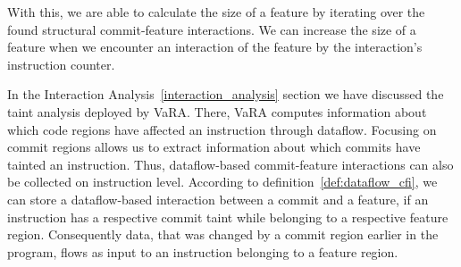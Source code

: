 With this, we are able to calculate the size of a feature by iterating over the found structural commit-feature interactions.
We can increase the size of a feature when we encounter an interaction of the feature by the interaction's instruction counter. 

In the Interaction Analysis~\ref{interaction_analysis} section we have discussed the taint analysis deployed by VaRA.
There, VaRA computes information about which code regions have affected an instruction through dataflow.
Focusing on commit regions allows us to extract information about which commits have tainted an instruction.
Thus, dataflow-based commit-feature interactions can also be collected on instruction level.
According to definition~\ref{def:dataflow_cfi}, we can store a dataflow-based interaction between a commit and a feature, if an instruction has a respective commit taint while belonging to a respective feature region.
Consequently data, that was changed by a commit region earlier in the program, flows as input to an instruction belonging to a feature region. 
\iffalse
For our research we examine numerous software projects to get a wide range of reference data, as commit-feature interactions could potentially vary greatly between different code spaces.
Accordingly, the VaRA-Tool-Suite was extended making it possible to generate a report comprising all found CFIs of an according type in a software project.
This aids us in examining several software projects to gain sufficient and sensible data about commit-feature interactions.
The created reports are also evaluated in the VaRA-Tool-Suite, which offers support to process and display statstics of the generated data. \\
\fi 
